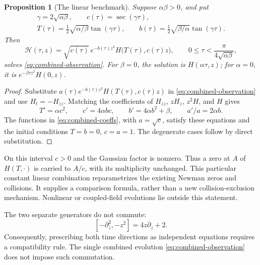 \documentclass[11pt]{article}
\newtheorem{proposition}{Proposition}[section]
\theoremstyle{remark}
\numberwithin{equation}{section}
\begin{document}
\begin{proposition}[The linear benchmark]\label{prop:combined}
Suppose \(\alpha\beta>0\), and put
\begin{equation}\label{eq:combined-coeffs}
 \begin{gathered}
 \gamma=2\sqrt{\alpha\beta},\qquad
 c(\tau)=\sec(\gamma\tau),\\
 T(\tau)=\tfrac12\sqrt{\alpha/\beta}\tan(\gamma\tau),\qquad
 b(\tau)=\tfrac12\sqrt{\beta/\alpha}\tan(\gamma\tau).
 \end{gathered}
\end{equation}
Then
\begin{equation}\label{eq:combined-solution}
 \boxed{\displaystyle
 \mathscr H(\tau,z)=\sqrt{c(\tau)}\,e^{-b(\tau)z^2}
 H\bigl(T(\tau),c(\tau)z\bigr),\qquad
 0\le\tau<\frac{\pi}{4\sqrt{\alpha\beta}},}
\end{equation}
solves \eqref{eq:combined-observation}. For \(\beta=0\), the solution
is \(H(\alpha\tau,z)\); for \(\alpha=0\), it is
\(e^{-\beta\tau z^2}H(0,z)\).
\end{proposition}
\begin{proof}
Substitute \(a(\tau)e^{-b(\tau)z^2}H(T(\tau),c(\tau)z)\)
in \eqref{eq:combined-observation} and use \(H_t=-H_{zz}\).
Matching the coefficients of \(H_{zz}\), \(zH_z\), \(z^2H\),
and \(H\) gives
\[
 T'=\alpha c^2,\qquad c'=4\alpha bc,\qquad
 b'=4\alpha b^2+\beta,\qquad a'/a=2\alpha b.
\]
The functions in \eqref{eq:combined-coeffs}, with \(a=\sqrt c\),
satisfy these equations and the initial conditions
\(T=b=0\), \(c=a=1\). The degenerate cases follow by direct
substitution.
\end{proof}

On this interval \(c>0\) and the Gaussian factor is nonzero. Thus a
zero at \(A\) of \(H(T,\cdot)\) is carried to \(A/c\), with its
multiplicity unchanged. This particular constant linear combination
reparametrizes the existing Newman zeros and collisions. It supplies a
comparison formula, rather than a new collision-exclusion mechanism.
Nonlinear or coupled-field evolutions lie outside this statement.

The two separate generators do not commute:
\begin{equation}\label{eq:commutator}
 [-\partial_z^2,-z^2]=4z\partial_z+2.
\end{equation}
Consequently, prescribing both time directions as independent equations
requires a compatibility rule. The single combined evolution
\eqref{eq:combined-observation} does not impose such commutation.
\end{document}
